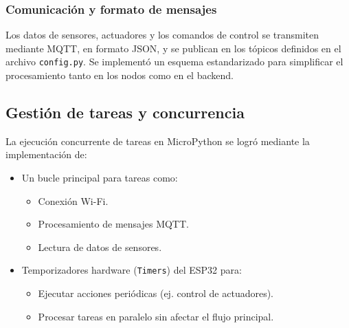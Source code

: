 \subsubsection{Comunicación y formato de mensajes}


Los datos de sensores, actuadores y los comandos de control se transmiten
mediante MQTT, en formato JSON, y se publican en los tópicos definidos en el
archivo \texttt{config.py}. Se implementó un esquema estandarizado para
simplificar el procesamiento tanto en los nodos como en el backend.


\subsection{Gestión de tareas y concurrencia}

La ejecución concurrente de tareas en MicroPython se logró mediante la
implementación de:

\begin{itemize}
    \item Un bucle principal para tareas como:
          \begin{itemize}
              \item Conexión Wi-Fi.
              \item Procesamiento de mensajes MQTT.
              \item Lectura de datos de sensores.
          \end{itemize}
    \item Temporizadores hardware (\texttt{Timers}) del ESP32 para:
          \begin{itemize}
              \item Ejecutar acciones periódicas (ej. control de actuadores).
              \item Procesar tareas en paralelo sin afectar el flujo principal.
          \end{itemize}
\end{itemize}


